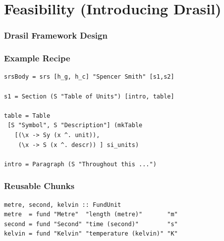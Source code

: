 \documentclass{beamer}
\begin{document}
\section[Feasibility]{Feasibility (Introducing Drasil)}


\begin{frame}

\frametitle{Drasil Framework Design}

\begin{center}
\end{center}

\end{frame}


\begin{frame}[fragile]

\frametitle{Example Recipe}

\begin{lstlisting}[frame=none, 
  showstringspaces=false, basicstyle=\small]
srsBody = srs [h_g, h_c] "Spencer Smith" [s1,s2]

s1 = Section (S "Table of Units") [intro, table]

table = Table 
 [S "Symbol", S "Description"] (mkTable
   [(\x -> Sy (x ^. unit)),
    (\x -> S (x ^. descr)) ] si_units)

intro = Paragraph (S "Throughout this ...")
\end{lstlisting}
\end{frame}


\begin{frame}[fragile]

\frametitle{Reusable Chunks}

\begin{lstlisting}[frame=none, showstringspaces=false, 
  basicstyle=\small]
metre, second, kelvin :: FundUnit
metre  = fund "Metre"  "length (metre)"       "m"
second = fund "Second" "time (second)"        "s"
kelvin = fund "Kelvin" "temperature (kelvin)" "K"
\end{lstlisting}

\end{frame}
\end{document}
